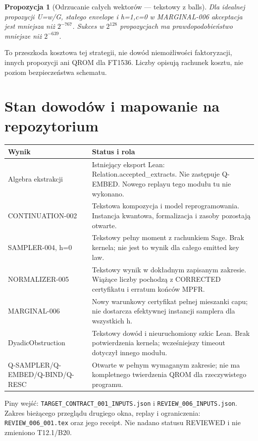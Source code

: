 \documentclass[11pt,a4paper]{article}
\newcommand{\code}[1]{\nolinkurl{#1}}
\newtheorem{proposition}{Propozycja}
\begin{document}
\begin{proposition}[Odrzucanie całych wektorów — tekstowy z balls]
Dla idealnej propozycji U=w/G, stałego envelope i h=1,c=0 w MARGINAL-006
akceptacja jest mniejsza niż $2^{-767}$. Sukces w $2^{128}$ propozycjach
ma prawdopodobieństwo mniejsze niż $2^{-639}$.
\end{proposition}
To przeszkoda kosztowa tej strategii, nie dowód niemożliwości faktoryzacji,
innych propozycji ani QROM dla FT1536. Liczby opisują rachunek kosztu,
nie poziom bezpieczeństwa schematu.

\section{Stan dowodów i mapowanie na repozytorium}
\small
\begin{longtable}{@{}p{.30\linewidth}p{.63\linewidth}@{}}
\toprule Wynik & Status i rola \\\midrule\endhead
Algebra ekstrakcji & Istniejący eksport Lean: Relation.accepted\_extracts.
Nie zastępuje Q-EMBED. Nowego replayu tego modułu tu nie wykonano.\\
CONTINUATION-002 & Tekstowa kompozycja i model reprogramowania.
Instancja kwantowa, formalizacja i zasoby pozostają otwarte.\\
SAMPLER-004, h=0 & Tekstowy pełny moment z rachunkiem Sage.
Brak kernela; nie jest to wynik dla całego emitted key law.\\
NORMALIZER-005 & Tekstowy wynik w dokładnym zapisanym zakresie.
Wiążące liczby pochodzą z CORRECTED certyfikatu i erratum końców MPFR.\\
MARGINAL-006 & Nowy warunkowy certyfikat pełnej mieszanki capu;
nie dostarcza efektywnej instancji samplera dla wszystkich h.\\
DyadicObstruction & Tekstowy dowód i nieuruchomiony szkic Lean.
Brak potwierdzenia kernela; wcześniejszy timeout dotyczył innego modułu.\\
Q-SAMPLER/Q-EMBED/Q-BIND/Q-RESC & Otwarte w pełnym wymaganym zakresie;
nie ma kompletnego twierdzenia QROM dla rzeczywistego programu.\\
\bottomrule\end{longtable}\normalsize

Piny wejść: \code{TARGET_CONTRACT_001_INPUTS.json} i
\code{REVIEW_006_INPUTS.json}. Zakres bieżącego przeglądu drugiego okna,
replay i ograniczenia: \code{REVIEW_006_001.tex} oraz jego receipt.
Nie nadano statusu REVIEWED i nie zmieniono T12.1/B20.
\end{document}
